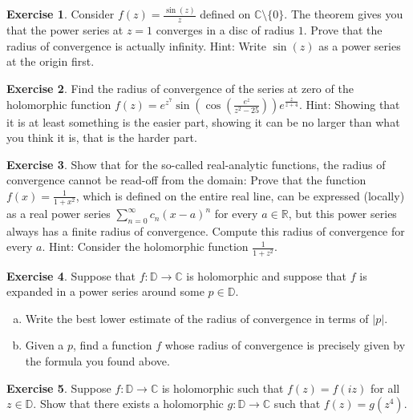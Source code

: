 \documentclass[12pt,openany]{book}
\newcommand{\sabs}[1]{\lvert {#1} \rvert}
\newcommand{\C}{{\mathbb{C}}}
\newcommand{\R}{{\mathbb{R}}}
\newcommand{\D}{{\mathbb{D}}}
\theoremstyle{plain}
\theoremstyle{remark}
\theoremstyle{definition}
\newenvironment{exbox}{%
    \def\FrameCommand{\vrule width 1pt \relax\hspace{10pt}}%
    \MakeFramed{\advance\hsize-\width\FrameRestore}%
}{%
    \endMakeFramed
}
\newenvironment{exparts}{%
    \leavevmode\begin{enumerate}[a),noitemsep,topsep=0pt,parsep=0pt,partopsep=0pt]
}{%
    \end{enumerate}
}
\theoremstyle{exercise}
\newtheorem{exercise}{Exercise}[section]
\theoremstyle{example}
\begin{document}
\begin{exbox}
\begin{exercise}
Consider $f(z) = \frac{\sin(z)}{z}$ defined on $\C \setminus \{ 0 \}$.
The theorem gives you that the power series at $z=1$ converges in a disc of
radius $1$.  Prove that the radius of convergence is actually infinity.  Hint:
Write $\sin(z)$ as a power series at the origin first.
\end{exercise}

\begin{exercise}
Find the radius of convergence of the series at zero of the holomorphic
function $f(z) =
e^{z^7}\sin\left(\cos\left(\frac{e^z}{z^2-25}\right)\right)e^{\frac{z}{z+4}}$.
Hint: Showing that it is at least something is the easier part, showing it
can be no larger than what you think it is, that is the harder part.
\end{exercise}

\begin{exercise}\label{exercise:realradconvhard}
\pagebreak[2]
Show that for the so-called real-analytic functions, the radius of
convergence cannot be read-off from the domain:
Prove that the function $f(x) = \frac{1}{1+x^2}$,
which is defined on the
entire real line, can be expressed (locally) as a real power series
$\sum_{n=0}^\infty c_n {(x-a)}^n$ for every $a \in \R$, but
this power series always has a finite radius of convergence.
Compute this radius of convergence for every $a$.  Hint: Consider
the holomorphic function $\frac{1}{1+z^2}$.
\end{exercise}

\begin{exercise}
Suppose that $f \colon \D \to \C$ is holomorphic and suppose that
$f$ is expanded in a power series around some $p \in \D$.
\begin{exparts}
\item
Write the best lower estimate of the radius of convergence in terms of
$\sabs{p}$.
\item
Given a $p$, find a function $f$ whose radius of convergence is precisely
given by the formula you found above.
\end{exparts}
\end{exercise}

\begin{exercise}
Suppose $f \colon \D \to \C$ is holomorphic such that
$f(z) = f(iz)$ for all $z \in \D$.  Show that there
exists a holomorphic $g \colon \D \to \C$ such that
$f(z) = g(z^4)$.
\end{exercise}


\end{exbox}
\end{document}

